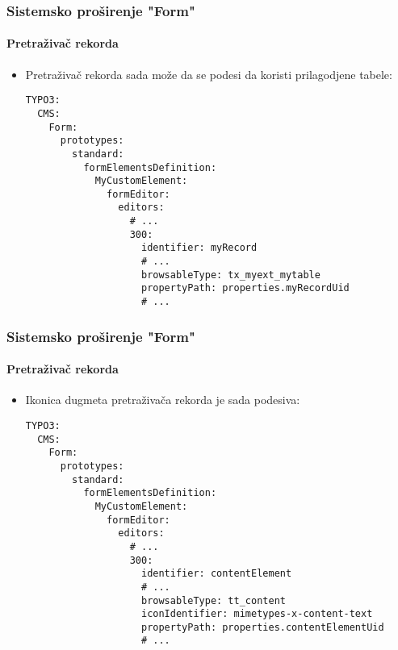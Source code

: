 
\begin{frame}[fragile]
	\frametitle{Sistemsko proširenje "Form"}
	\framesubtitle{Pretraživač rekorda}

	\lstset{basicstyle=\tiny\ttfamily}

	\begin{itemize}
		\item Pretraživač rekorda sada može da se podesi da koristi prilagodjene tabele:
\begin{lstlisting}
TYPO3:
  CMS:
    Form:
      prototypes:
        standard:
          formElementsDefinition:
            MyCustomElement:
              formEditor:
                editors:
                  # ...
                  300:
                    identifier: myRecord
                    # ...
                    browsableType: tx_myext_mytable
                    propertyPath: properties.myRecordUid
                    # ...
\end{lstlisting}

	\end{itemize}

\end{frame}


\begin{frame}[fragile]
	\frametitle{Sistemsko proširenje "Form"}
	\framesubtitle{Pretraživač rekorda}

	\lstset{basicstyle=\tiny\ttfamily}

	\begin{itemize}
		\item Ikonica dugmeta pretraživača rekorda je sada podesiva:
\begin{lstlisting}
TYPO3:
  CMS:
    Form:
      prototypes:
        standard:
          formElementsDefinition:
            MyCustomElement:
              formEditor:
                editors:
                  # ...
                  300:
                    identifier: contentElement
                    # ...
                    browsableType: tt_content
                    iconIdentifier: mimetypes-x-content-text
                    propertyPath: properties.contentElementUid
                    # ...
\end{lstlisting}

	\end{itemize}

\end{frame}

